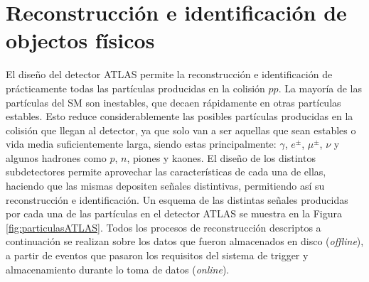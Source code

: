 \chapter{Reconstrucción e identificación de objectos físicos}\label{cap:objects}



El diseño del detector ATLAS permite la reconstrucción e identificación de prácticamente todas las
partículas producidas en la colisión $pp$. 
La mayoría de las partículas del SM son inestables, que decaen rápidamente en otras partículas estables. Esto reduce considerablemente las posibles partículas producidas en la colisión que llegan al detector, ya que solo van a ser aquellas que sean estables o vida media suficientemente larga, siendo estas principalmente: $\gamma$, $e^{\pm}$, $\mu^{\pm}$, $\nu$ y algunos hadrones
como $p$, $n$, piones y kaones. El diseño de los distintos subdetectores permite aprovechar las
características de cada una de ellas, haciendo que las mismas depositen señales distintivas, permitiendo así su reconstrucción e identificación. Un esquema de las distintas señales producidas por cada una de las partículas en el detector ATLAS se muestra en la Figura \ref{fig:particulasATLAS}. Todos los procesos de reconstrucción descriptos a continuación se realizan sobre los datos que fueron almacenados en disco (\textit{offline}), a partir de eventos que pasaron los requisitos del sistema de trigger y almacenamiento durante lo toma de datos (\textit{online}).




